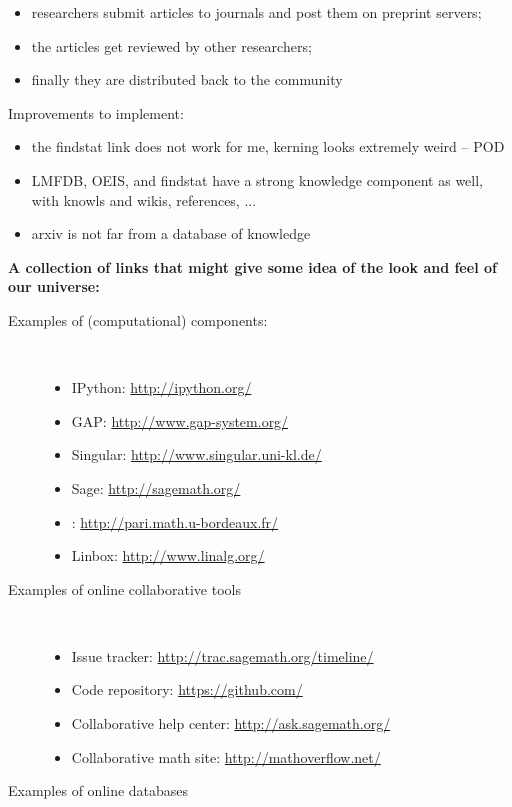 {\begin{description}
\begin{description}
\begin{itemize}
      \item researchers submit articles to journals and post them on
        preprint servers;
      \item the articles get reviewed by other researchers;
      \item finally they are distributed back to the community
      \end{itemize}
    \end{description}
  \end{description}
  Improvements to implement:
  \begin{itemize}
  \item the findstat link does not work for me, kerning looks
    extremely weird -- POD
  \item LMFDB, OEIS, and findstat have a strong knowledge component as
    well, with knowls and wikis, references, ...
  \item arxiv is not far from a database of knowledge
  \end{itemize}
  \textbf{\Large A collection of links that might give some idea of
    the look and feel of our universe:}
  \begin{description}
  \item[Examples of (computational) components:]\ 
    \begin{itemize}
    \item IPython: \url{http://ipython.org/}
    \item GAP: \url{http://www.gap-system.org/}
    \item Singular: \url{http://www.singular.uni-kl.de/}
    \item Sage: \url{http://sagemath.org/}
    \item \PariGP: \url{http://pari.math.u-bordeaux.fr/}
    \item Linbox: \url{http://www.linalg.org/}
    \end{itemize}
  \item[Examples of online collaborative tools]\ 
    \begin{itemize}
    \item Issue tracker: \url{http://trac.sagemath.org/timeline/}
    \item Code repository: \url{https://github.com/}
    \item Collaborative help center: \url{http://ask.sagemath.org/}
    \item Collaborative math site: \url{http://mathoverflow.net/}
    \end{itemize}
  \item[Examples of online databases]\ 

\end{description}}
